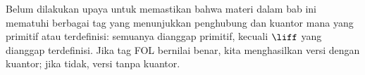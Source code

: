 \documentclass[../../../include/open-logic-chapter]{subfiles}
\begin{document}
      {}
      {}

\begin{editorial}
  Belum dilakukan upaya untuk memastikan bahwa materi dalam bab ini
  mematuhi berbagai tag yang menunjukkan penghubung dan kuantor mana
  yang primitif atau terdefinisi: semuanya dianggap primitif, kecuali
  $\liff$ yang dianggap terdefinisi. Jika tag FOL bernilai benar, kita
  menghasilkan versi dengan kuantor; jika tidak, versi tanpa kuantor.
\end{editorial}














\OLEndChapterHook
\end{document}
